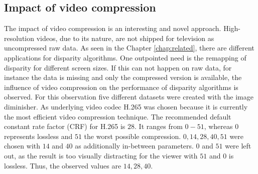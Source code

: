 \subsection{Impact of video compression}

The impact of video compression is an interesting and novel approach.
High-resolution videos, due to its nature, are not shipped for television as uncompressed raw data.
As seen in the Chapter \ref{chap:related}, there are different applications for disparity algorithms.
One outpointed need is the remapping of disparity for different screen sizes.
If this can not happen on raw data, for instance the data is missing and only the compressed version is available, the influence of video compression on the performance of disparity algorithms is observed.
\noindent For this observation five different datasets were created with the image diminisher.
As underlying video codec H.265 was chosen because it is currently the most efficient video compression technique.
The recommended default constant rate factor (CRF) for H.265 is $28$.
It ranges from $0-51$, whereas $0$ represents lossless and $51$ the worst possible compression.
$0, 14, 28, 40, 51$ were chosen with $14$ and $40$ as additionally in-between parameters.
$0$ and $51$ were left out, as the result is too visually distracting for the viewer with $51$ and $0$ is lossless.
Thus, the observed values are $14, 28, 40$.

